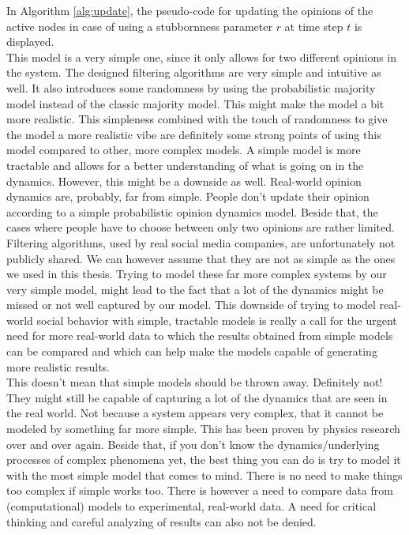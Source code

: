 \documentclass[11 pt , letterpaper , twoside , openright]{book}
\begin{document}
In Algorithm \ref{alg:update}, the pseudo-code for updating the opinions of the active nodes in case of using a stubbornness parameter $r$ at time step $t$ is displayed. \\
\newline
This model is a very simple one, since it only allows for two different opinions in the system. The designed filtering algorithms are very simple and intuitive as well. It also introduces some randomness by using the probabilistic majority model instead of the classic majority model. This might make the model a bit more realistic. This simpleness combined with the touch of randomness to give the model a more realistic vibe are definitely some strong points of using this model compared to other, more complex models. A simple model is more tractable and allows for a better understanding of what is going on in the dynamics. However, this might be a downside as well. Real-world opinion dynamics are, probably, far from simple. People don't update their opinion according to a simple probabilistic opinion dynamics model. Beside that, the cases where people have to choose between only two opinions are rather limited. Filtering algorithms, used by real social media companies, are unfortunately not publicly shared. We can however assume that they are not as simple as the ones we used in this thesis. Trying to model these far more complex systems by our very simple model, might lead to the fact that a lot of the dynamics might be missed or not well captured by our model. This downside of trying to model real-world social behavior with simple, tractable models is really a call for the urgent need for more real-world data to which the results obtained from simple models can be compared and which can help make the models capable of generating more realistic results. \\
This doesn't mean that simple models should be thrown away. Definitely not! They might still be capable of capturing a lot of the dynamics that are seen in the real world. Not because a system appears very complex, that it cannot be modeled by something far more simple. This has been proven by physics research over and over again. Beside that, if you don't know the dynamics/underlying processes of complex phenomena yet, the best thing you can do is try to model it with the most simple model that comes to mind. There is no need to make things too complex if simple works too. There is however a need to compare data from (computational) models to experimental, real-world data. A need for critical thinking and careful analyzing of results can also not be denied.
\end{document}
